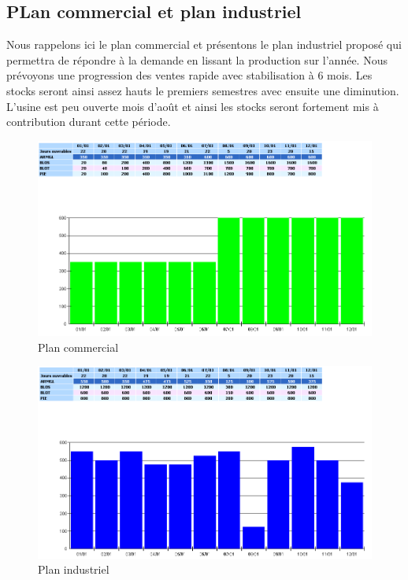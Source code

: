 \documentclass[a4paper]{TPInsa}
\begin{document}
	\subsection{PLan commercial et plan industriel}
	
	Nous rappelons ici le plan commercial et présentons le plan industriel proposé qui permettra de répondre à la demande en lissant la production sur l'année. Nous prévoyons une progression des ventes rapide avec stabilisation à 6 mois. Les stocks seront ainsi assez hauts le premiers semestres avec ensuite une diminution. L'usine est peu ouverte mois d’août et ainsi les stocks seront fortement mis à contribution durant cette période.
	
	\begin{figure}[H]
	\centering
	\includegraphics[scale=0.6]{captures/plan_commercial.PNG}
	\caption{Plan commercial}
	\end{figure}
	
	\begin{figure}[H]
	\centering
	\includegraphics[scale=0.6]{captures/plan_industriel.PNG}
	\caption{Plan industriel}
	\end{figure}
	
\end{document}
